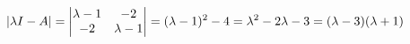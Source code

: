 \documentclass[preview]{standalone}
\begin{document}
\begin{align*}
\special{dvisvgm:raw <g id='unique000'>}|\lambda I-A|=\begin{vmatrix}\lambda-1&-2\\-2&\lambda-1\end{vmatrix}=(\lambda-1)^2-4=\lambda^2-2\lambda-3=(\lambda-3)(\lambda+1)\special{dvisvgm:raw </g>}
\end{align*}
\end{document}
